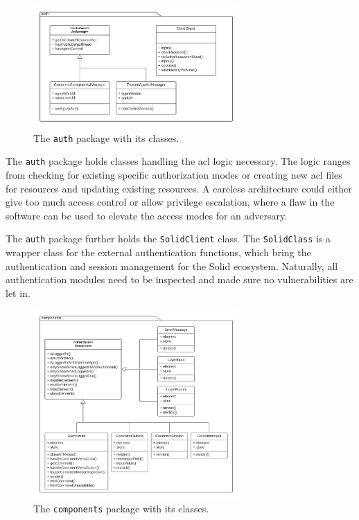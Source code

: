 \begin{figure}
    \centering
    \includegraphics[width=0.7\textwidth]{prototype/graphs/poc-comment-package-auth.png}
    \caption{The \texttt{auth} package with its classes.}
    \label{fig:poc-comment-package-auth}
\end{figure}

The \texttt{auth} package holds classes handling the \gls{acl} logic necessary. The logic ranges from checking for existing specific authorization modes or creating new \gls{acl} files for resources and updating existing resources. A careless architecture could either give too much access control or allow privilege escalation, where a flaw in the software can be used to elevate the access modes for an adversary.

The \texttt{auth} package further holds the \texttt{SolidClient} class. The \texttt{SolidClass} is a wrapper class for the external authentication functions, which bring the authentication and session management for the Solid ecosystem. Naturally, all authentication modules need to be inspected and made sure no vulnerabilities are let in.

\begin{figure}
    \centering
    \includegraphics[width=0.7\textwidth]{prototype/graphs/poc-comment-package-components.png}
    \caption{The \texttt{components} package with its classes.}
    \label{fig:poc-comment-package-components}
\end{figure}


